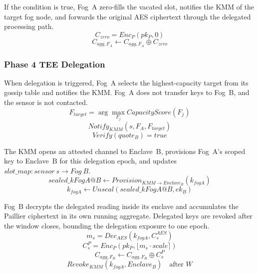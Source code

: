 \documentclass[conference]{IEEEtran}
\begin{document}
    If the condition is true, Fog~A zero-fills the vacated slot, notifies the KMM of the target fog node, and forwards the original AES ciphertext through the delegated processing path.
    \begin{equation}
    C_{zero} = Enc_P(pk_P,0)
    \end{equation}
    \begin{equation}
    C_{agg,F_A} \leftarrow C_{agg,F_A} \oplus C_{zero}
    \end{equation}

    \subsubsection{\textbf{Phase 4 TEE Delegation}}

    When delegation is triggered, Fog~A selects the highest-capacity target from its gossip table and notifies the KMM. Fog~A does not transfer keys to Fog~B, and the sensor is not contacted.
    \begin{equation}
    F_{target}=\arg\max_{F_j} CapacityScore(F_j)
    \end{equation}
    \begin{equation}
    Notify_{KMM}(s,F_A,F_{target})
    \end{equation}
    \begin{equation}
    Verify(quote_B)=true
    \end{equation}

    The KMM opens an attested channel to Enclave~B, provisions Fog~A's scoped key to Enclave~B for this delegation epoch, and updates $slot\_map:sensor~s\rightarrow Fog~B$.
    \begin{equation}
    sealed\_kFogA@B \leftarrow Provision_{KMM\rightarrow Enclave_B}(k_{fogA})
    \end{equation}
    \begin{equation}
    k_{fogA} \leftarrow Unseal(sealed\_kFogA@B,ek_B)
    \end{equation}

    Fog~B decrypts the delegated reading inside its enclave and accumulates the Paillier ciphertext in its own running aggregate. Delegated keys are revoked after the window closes, bounding the delegation exposure to one epoch.
    \begin{equation}
    m_s = Dec_{AES}(k_{fogA}, C_s^{AES})
    \end{equation}
    \begin{equation}
    C_s^P = Enc_P(pk_P, \lfloor m_s \cdot scale \rceil)
    \end{equation}
    \begin{equation}
    C_{agg,F_B} \leftarrow C_{agg,F_B} \oplus C_s^P
    \end{equation}
    \begin{equation}
    Revoke_{KMM}(k_{fogA}, Enclave_B)\quad \text{after } W
    \end{equation}
\end{document}
